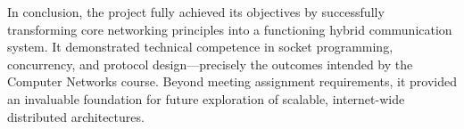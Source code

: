 \vspace{0.5em}
In conclusion, the project fully achieved its objectives by successfully transforming core networking principles into a functioning hybrid communication system. 
It demonstrated technical competence in socket programming, concurrency, and protocol design—precisely the outcomes intended by the Computer Networks course. 
Beyond meeting assignment requirements, it provided an invaluable foundation for future exploration of scalable, internet-wide distributed architectures.
